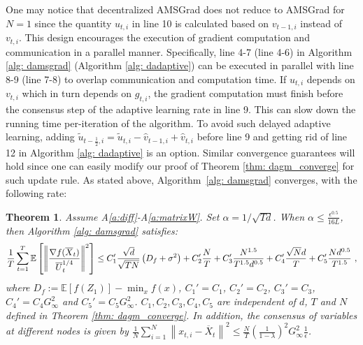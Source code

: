 \documentclass[11pt]{article}
\newtheorem{theorem}{Theorem}
\begin{document}
One may notice that decentralized AMSGrad does not reduce to AMSGrad for $N=1$ since the quantity $u_{t,i}$ in line 10 is calculated based on $v_{t-1,i}$ instead of $v_{t,i}$.
This design encourages the execution of gradient computation and communication in a parallel manner. 
Specifically, line 4-7 (line 4-6) in Algorithm \ref{alg: damsgrad} (Algorithm \ref{alg: dadaptive}) can be executed in parallel with line 8-9 (line 7-8) to overlap communication and computation time. 
If $u_{t,i}$ depends on $v_{t,i}$ which in turn depends on $g_{t,i}$, the gradient computation must finish before the consensus step of the adaptive learning rate in line 9. 
This can slow down the running time per-iteration of the algorithm. 
To avoid such delayed adaptive learning, adding $\tilde u_{t-\frac{1}{2},i} = \tilde u_{t,i} - \hat v_{t-1,i} + \hat v_{t,i}$ before line 9 and getting rid of line 12 in Algorithm \ref{alg: dadaptive} is an option.
Similar convergence guarantees will hold since one can easily modify our proof of Theorem \ref{thm: dagm_converge} for such update rule. 
As stated above, Algorithm~\ref{alg: damsgrad} converges, with the following rate:
\begin{theorem}\label{thm: dams_converge}
Assume A\ref{a:diff}-A\ref{a:matrixW}.
Set $\alpha = 1/\sqrt{Td}$. When $\alpha  \leq \frac{\epsilon^{0.5}}{16L} $, then Algorithm \ref{alg: damsgrad} satisfies:
 {\small
	  \begin{align}\notag
	  \frac{1}{T}\sum_{t=1}^T  \mathbb E \left [\left\|\frac{\nabla f( \overline X_{t})}{\overline U_{t}^{1/4}}\right\|^2  \right]
	  \leq  C_1' \frac{\sqrt{d}}{\sqrt{TN}} \left(D_f +    \sigma^2 \right) +  C_2' \frac{N}{T}  +  C_3' \frac{N^{1.5}}{T^{1.5}d^{0.5}} 
+  C_4' \frac{\sqrt{N}d}{T} +  C_5'  \frac{Nd^{0.5}}{T^{1.5}}  \ ,
	  \end{align}
	  }
	where $D_f := \mathbb E  [f( Z_{1})]  -  \min_x  f(x)$, $C_1' = C_1$, $C_2' = C_2$, $C_3' = C_3$, $C_4' = C_4G_{\infty}^2$ and $C_5' = C_5 G_{\infty}^2 $. $C_1,C_2, C_3, C_4, C_5$ are independent of $d$, $T$ and $N$ defined in Theorem \ref{thm: dagm_converge}. In addition, the consensus of variables at different nodes is given by $\frac{1}{N}\sum_{i=1}^N\left\| {  x_{t,i} -   \overline X_{t}}  \right\|^2   \leq \frac{N}{T} \left (\frac{1}{1-\lambda} \right)^2  G_{\infty}^2 \frac{1}{\epsilon}$. 
\end{theorem}
\end{document}
